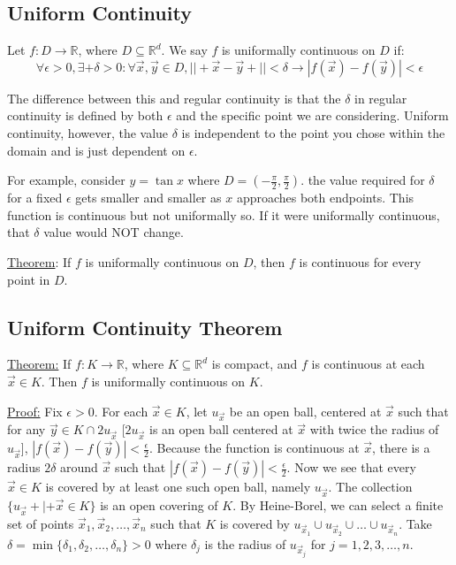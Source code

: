 \documentclass[11 pt, twoside]{article}
\begin{document}
\subsection{Uniform Continuity}
Let $f: D \to \mathbb{R}$, where $D \subseteq \mathbb{R}^d$. We say $f$ is
uniformally continuous on $D$ if:
$$\forall \epsilon > 0, \exists+\delta > 0: \forall \vec{x}, \vec{y} \in D,
||+\vec{x} - \vec{y}+|| < \delta \to |f(\vec{x}) - f(\vec{y})| < \epsilon$$

The difference between this and regular continuity is that the $\delta$ in
regular continuity is defined by both $\epsilon$ and the specific point we
are considering. Uniform continuity, however, the value $\delta$ is independent
to the point you chose within the domain and is just dependent on $\epsilon$.

For example, consider $y = \tan{x}$ where $D = (-\frac{\pi}{2}, \frac{\pi}{2})$.
the value required for $\delta$ for a fixed $\epsilon$ gets smaller and
smaller as $x$ approaches both endpoints. This function is continuous but not
uniformally so. If it were uniformally continuous,
that $\delta$ value would NOT change.

\underline{Theorem}: If $f$ is uniformally continuous on $D$, then $f$ is continuous
for every point in $D$.

\subsection{Uniform Continuity Theorem}
\underline{Theorem:}
If $f: K \to \mathbb{R}$, where $K \subseteq \mathbb{R}^d$ is compact, and
$f$ is continuous at each $\vec{x} \in K$. Then $f$ is uniformally continuous on
$K$.

\underline{Proof:}
Fix $\epsilon > 0$. For each $\vec{x} \in K$, let $u_{\vec{x}}$ be an open ball, centered at
$\vec{x}$ such that for any $\vec{y} \in K \cap 2u_{\vec{x}}$ [$2u_{\vec{x}}$ is
an open ball centered at $\vec{x}$ with twice the radius of $u_{\vec{x}}$], $|f(\vec{x}) -
f(\vec{y})| < \frac{\epsilon}{2}$. Because the function is continuous at
$\vec{x}$, there is a radius $2\delta$ around $\vec{x}$ such that $|f(\vec{x}) -
f(\vec{y})| < \frac{\epsilon}{2}$. Now we see that every $\vec{x} \in K$ is
covered by at least one such open ball, namely $u_{\vec{x}}$. The collection
$\{u_{\vec{x}} +|+ \vec{x} \in K\}$ is an open covering of $K$. By
Heine-Borel, we can select a finite set of points $\vec{x}_1, \vec{x}_2, \dots,
\vec{x}_n$ such that $K$ is covered by $u_{\vec{x}_1} \cup u_{\vec{x}_2} \cup \dots
\cup u_{\vec{x}_n}$. Take $\delta = \min\{\delta_1, \delta_2, \dots, \delta_n\}
> 0$  where $\delta_j$ is the radius of $u_{\vec{x}_j}$ for $j = 1,2,3,\dots,n$.
\end{document}
